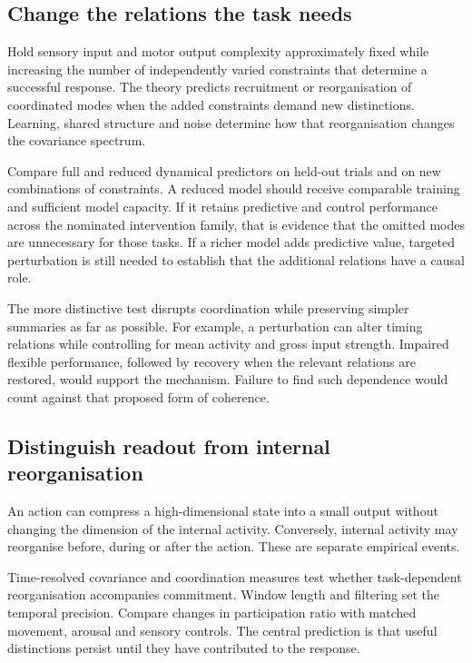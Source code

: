 \documentclass[11pt,a4paper]{article}
\begin{document}
\subsection{Change the relations the task needs}

Hold sensory input and motor output complexity approximately fixed while increasing the number of independently varied constraints that determine a successful response. The theory predicts recruitment or reorganisation of coordinated modes when the added constraints demand new distinctions. Learning, shared structure and noise determine how that reorganisation changes the covariance spectrum.

Compare full and reduced dynamical predictors on held-out trials and on new combinations of constraints. A reduced model should receive comparable training and sufficient model capacity. If it retains predictive and control performance across the nominated intervention family, that is evidence that the omitted modes are unnecessary for those tasks. If a richer model adds predictive value, targeted perturbation is still needed to establish that the additional relations have a causal role.

The more distinctive test disrupts coordination while preserving simpler summaries as far as possible. For example, a perturbation can alter timing relations while controlling for mean activity and gross input strength. Impaired flexible performance, followed by recovery when the relevant relations are restored, would support the mechanism. Failure to find such dependence would count against that proposed form of coherence.

\subsection{Distinguish readout from internal reorganisation}

An action can compress a high-dimensional state into a small output without changing the dimension of the internal activity. Conversely, internal activity may reorganise before, during or after the action. These are separate empirical events.

Time-resolved covariance and coordination measures test whether task-dependent reorganisation accompanies commitment. Window length and filtering set the temporal precision. Compare changes in participation ratio with matched movement, arousal and sensory controls. The central prediction is that useful distinctions persist until they have contributed to the response.
\end{document}
